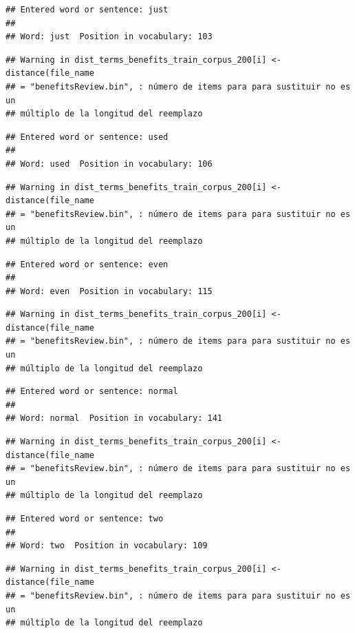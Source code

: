 \documentclass[spanish,]{article}
\begin{document}
\begin{verbatim}
## Entered word or sentence: just
## 
## Word: just  Position in vocabulary: 103
\end{verbatim}

\begin{verbatim}
## Warning in dist_terms_benefits_train_corpus_200[i] <- distance(file_name
## = "benefitsReview.bin", : número de items para para sustituir no es un
## múltiplo de la longitud del reemplazo
\end{verbatim}

\begin{verbatim}
## Entered word or sentence: used
## 
## Word: used  Position in vocabulary: 106
\end{verbatim}

\begin{verbatim}
## Warning in dist_terms_benefits_train_corpus_200[i] <- distance(file_name
## = "benefitsReview.bin", : número de items para para sustituir no es un
## múltiplo de la longitud del reemplazo
\end{verbatim}

\begin{verbatim}
## Entered word or sentence: even
## 
## Word: even  Position in vocabulary: 115
\end{verbatim}

\begin{verbatim}
## Warning in dist_terms_benefits_train_corpus_200[i] <- distance(file_name
## = "benefitsReview.bin", : número de items para para sustituir no es un
## múltiplo de la longitud del reemplazo
\end{verbatim}

\begin{verbatim}
## Entered word or sentence: normal
## 
## Word: normal  Position in vocabulary: 141
\end{verbatim}

\begin{verbatim}
## Warning in dist_terms_benefits_train_corpus_200[i] <- distance(file_name
## = "benefitsReview.bin", : número de items para para sustituir no es un
## múltiplo de la longitud del reemplazo
\end{verbatim}

\begin{verbatim}
## Entered word or sentence: two
## 
## Word: two  Position in vocabulary: 109
\end{verbatim}

\begin{verbatim}
## Warning in dist_terms_benefits_train_corpus_200[i] <- distance(file_name
## = "benefitsReview.bin", : número de items para para sustituir no es un
## múltiplo de la longitud del reemplazo
\end{verbatim}
\end{document}
